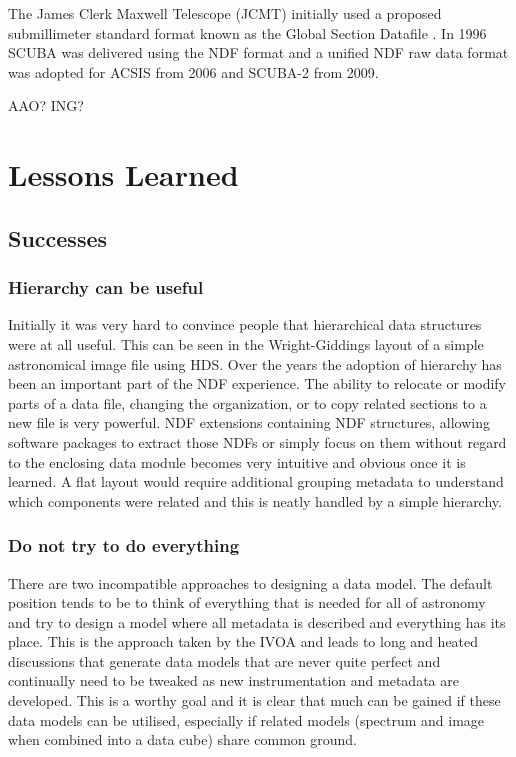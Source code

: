 \documentclass[final,authoryear,5p,times,twocolumn]{elsarticle}
\begin{document}
The James Clerk Maxwell Telescope (JCMT) initially used a proposed
submillimeter standard format known as the Global Section Datafile
\citep[GSD;][formerly General Single Dish Data]{sun229}. In 1996 SCUBA
\citep{1999MNRAS.303..659H} was delivered using the NDF format and a
unified NDF raw data format was adopted for ACSIS
\citep{2009MNRAS.399.1026B} from 2006 and SCUBA-2
\citep{2013MNRAS.430.2513H} from 2009.

{\color{red}AAO? ING?}

\section{Lessons Learned}

\subsection{Successes}

\subsubsection{Hierarchy can be useful}

Initially it was very hard to convince people that hierarchical data
structures were at all useful. This can be seen in the Wright-Giddings
layout of a simple astronomical image file using HDS. Over the years
the adoption of hierarchy has been an important part of the NDF
experience. The ability to relocate or modify parts of a data file,
changing the organization, or to copy related sections to a new file
is very powerful.  NDF extensions containing NDF structures, allowing
software packages to extract those NDFs or simply focus on them
without regard to the enclosing data module becomes very intuitive and
obvious once it is learned. A flat layout would require additional
grouping metadata to understand which components were related and this
is neatly handled by a simple hierarchy.

\subsubsection{Do not try to do everything}

There are two incompatible approaches to designing a data model. The
default position tends to be to think of everything that is needed for
all of astronomy and try to design a model where all metadata is
described and everything has its place. This is the approach taken by
the IVOA \citep[see e.g.][]{2012arXiv1204.3055M} and leads to long and
heated discussions that generate data models that are never quite
perfect and continually need to be tweaked as new instrumentation and
metadata are developed. This is a worthy goal and it is clear that
much can be gained if these data models can be utilised, especially if
related models (spectrum and image when combined into a data cube)
share common ground.
\end{document}
